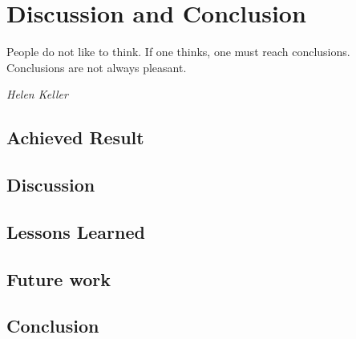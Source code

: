 \chapter{Discussion and Conclusion}
\epigraph{People do not like to think. If one thinks, one must reach conclusions. Conclusions are not always pleasant.}{\textit{Helen Keller}}
\section{Achieved Result}

\section{Discussion}

\section{Lessons Learned}

\section{Future work}

\section{Conclusion}

